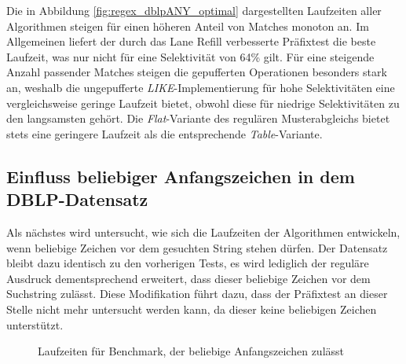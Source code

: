 Die in Abbildung \ref{fig:regex_dblpANY_optimal} dargestellten Laufzeiten aller Algorithmen steigen für einen höheren Anteil von Matches monoton an.
Im Allgemeinen liefert der durch das Lane Refill verbesserte Präfixtest die beste Laufzeit, was nur nicht für eine Selektivität von 64\% gilt.
Für eine steigende Anzahl passender Matches steigen die gepufferten Operationen besonders stark an, weshalb die ungepufferte \emph{LIKE}-Implementierung für hohe Selektivitäten eine vergleichsweise geringe Laufzeit bietet, obwohl diese für niedrige Selektivitäten zu den langsamsten gehört.
Die \emph{Flat}-Variante des regulären Musterabgleichs bietet stets eine geringere Laufzeit als die entsprechende \emph{Table}-Variante.

\subsection{Einfluss beliebiger Anfangszeichen in dem DBLP-Datensatz}
\label{sec:regex_evaluation_beobachtung_4}

Als nächstes wird untersucht, wie sich die Laufzeiten der Algorithmen entwickeln, wenn beliebige Zeichen vor dem gesuchten String stehen dürfen.
Der Datensatz bleibt dazu identisch zu den vorherigen Tests, es wird lediglich der reguläre Ausdruck dementsprechend erweitert, dass dieser beliebige Zeichen vor dem Suchstring zulässt.
Diese Modifikation führt dazu, dass der Präfixtest an dieser Stelle nicht mehr untersucht werden kann, da dieser keine beliebigen Zeichen unterstützt.

\begin{figure}[ht]
	\centering
	\caption{Laufzeiten für Benchmark, der beliebige Anfangszeichen zulässt}
	\label{fig:regex_ANYdblpANY}
\end{figure}

